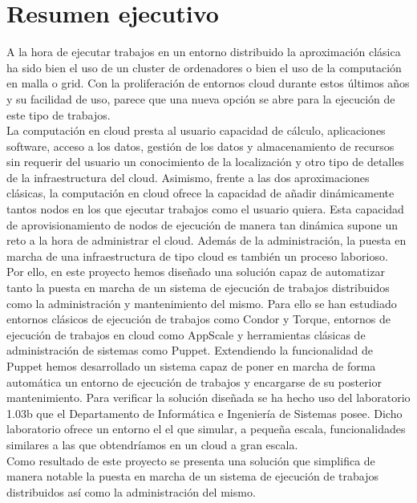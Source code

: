 \chapter{Resumen ejecutivo}

{\sf

A la hora de ejecutar trabajos en un entorno distribuido la aproximación clásica ha sido bien el uso de un cluster de ordenadores o bien el uso de la computación en malla o grid. Con la proliferación de entornos cloud durante estos últimos años y su facilidad de uso, parece que una nueva opción se abre para la ejecución de este tipo de trabajos.\\

La computación en cloud presta al usuario capacidad de cálculo, aplicaciones software, acceso a los datos, gestión de los datos y almacenamiento de recursos sin requerir del usuario un conocimiento de la localización y otro tipo de detalles de la infraestructura del cloud. Asimismo, frente a las dos aproximaciones clásicas, la computación en cloud ofrece la capacidad de añadir dinámicamente tantos nodos en los que ejecutar trabajos como el usuario quiera. Esta capacidad de aprovisionamiento de nodos de ejecución de manera tan dinámica supone un reto a la hora de administrar el cloud. Además de la administración, la puesta en marcha de una infraestructura de tipo cloud es también un proceso laborioso.\\

Por ello, en este proyecto hemos diseñado una solución capaz de automatizar tanto la puesta en marcha de un sistema de ejecución de trabajos distribuidos como la administración y mantenimiento del mismo. Para ello se han estudiado entornos clásicos de ejecución de trabajos como Condor y Torque, entornos de ejecución de trabajos en cloud como AppScale y herramientas clásicas de administración de sistemas como Puppet. Extendiendo la funcionalidad de Puppet hemos desarrollado un sistema capaz de poner en marcha de forma automática un entorno de ejecución de trabajos y encargarse de su posterior mantenimiento. Para verificar la solución diseñada se ha hecho uso del laboratorio 1.03b que el Departamento de Informática e Ingeniería de Sistemas posee. Dicho laboratorio ofrece un entorno el el que simular, a pequeña escala, funcionalidades similares a las que obtendríamos en un cloud a gran escala.\\

Como resultado de este proyecto se presenta una solución que simplifica de manera notable la puesta en marcha de un sistema de ejecución de trabajos distribuidos así como la administración del mismo.
}
